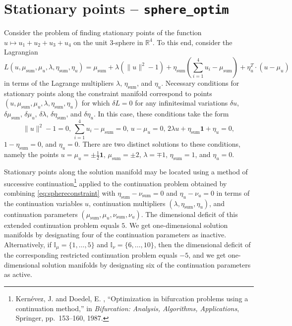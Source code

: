 \section{Stationary points  -- \texttt{sphere\_optim}}
Consider the problem of finding stationary points of the function $u\mapsto u_1+u_2+u_3+u_4$ on the unit $3$-sphere in $\mathbb{R}^4$. To this end, consider the Lagrangian
\begin{equation}
\label{eq:spherelagr}
L(u,\mu_\mathrm{sum},\mu_u,\lambda,\eta_\mathrm{sum},\eta_u)=\mu_\mathrm{sum}+\lambda(\|u\|^2-1)+\eta_\mathrm{sum}\left(\sum_{i=1}^4u_i-\mu_\mathrm{sum}\right)+\eta_u^T\cdot(u-\mu_u)
\end{equation}
in terms of the Lagrange multipliers $\lambda$, $\eta_\mathrm{sum}$, and $\eta_u$. Necessary conditions for stationary points along the constraint manifold correspond to points $(u,\mu_\mathrm{sum},\mu_u,\lambda,\eta_\mathrm{sum},\eta_u)$ for which $\delta L=0$ for any infinitesimal variations $\delta u$, $\delta\mu_\mathrm{sum}$, $\delta\mu_u$, $\delta\lambda$, $\delta\eta_\mathrm{sum}$, and $\delta\eta_u$. In this case, these conditions take the form
\begin{equation}
\label{eq:sphereconstraint}
\|u\|^2-1=0,\,\sum_{i=1}^4u_i-\mu_\mathrm{sum}=0,\,u-\mu_u=0,\,2\lambda u+\eta_\mathrm{sum}\mathbf{1}+\eta_u=0,
\end{equation}
$1-\eta_\mathrm{sum}=0$, and $\eta_u=0$. There are two distinct solutions to these conditions, namely the points $u=\mu_u=\pm\frac{1}{2}\mathbf{1}$, $\mu_\mathrm{sum}=\pm 2$, $\lambda=\mp 1$, $\eta_\mathrm{sum}=1$, and $\eta_u=0$.

Stationary points along the solution manifold may be located using a method of successive continuation\footnote{Kern\'{e}vez, J. and Doedel, E. , ``Optimization in bifurcation problems using a continuation method,'' in \emph{Bifurcation: Analysis, Algorithms, Applications}, Springer, pp.~153--160, 1987.} applied to the continuation problem obtained by combining \eqref{eq:sphereconstraint} with $\eta_\mathrm{sum}-\nu_\mathrm{sum}=0$ and $\eta_u-\nu_u=0$ in terms of the continuation variables $u$, continuation multipliers $(\lambda,\eta_\mathrm{sum},\eta_u)$, and continuation parameters $(\mu_\mathrm{sum},\mu_u,\nu_\mathrm{sum},\nu_u)$. The dimensional deficit of this extended continuation problem equals $5$. We get one-dimensional solution manifolds by designating four of the continuation parameters as inactive. Alternatively, if $\mathbb{I}_\mu=\{1,\ldots,5\}$ and $\mathbb{I}_\nu=\{6,\ldots,10\}$, then the dimensional deficit of the corresponding restricted continuation problem equals $-5$, and we get one-dimensional solution manifolds by designating six of the continuation parameters as active.

